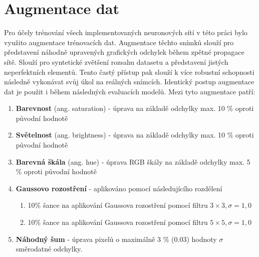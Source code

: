 \section{Augmentace dat}
\label{sec:Chapter41}
Pro účely trénování všech implementovaných neuronových sítí v této práci bylo využito augmentace trénovacích dat. Augmentace těchto snímků slouží pro představení náhodně upravených grafických odchylek během zpětné propagace sítě. Slouží pro syntetické zvětšení rozsahu datasetu a představení jistých neperfektních elementů. Tento častý přístup pak slouží k více robustní schopnosti následně vykonávat svůj úkol na reálných snímcích. Identický postup augmentace dat je použit i během následných evaluacích modelů. Mezi tyto augmentace patří:
\begin{enumerate}
  \item \textbf{Barevnost} (ang. saturation) - úprava na základě odchylky max. 10 \% oproti původní hodnotě
  \item \textbf{Světelnost} (ang. brightness) - úprava na základě odchylky max. 10 \% oproti původní hodnotě
  \item \textbf{Barevná škála} (ang. hue) - úprava RGB škály na základě odchylky max. 5 \% oproti původní hodnotě
  \item \textbf{Gaussovo rozostření} - aplikováno pomocí následujícího rozdělení
  \begin{enumerate}
      \item 10\% šance na aplikování Gaussova rozostření pomocí filtru $3\times3, \sigma=1,0$
      \item 10\% šance na aplikování Gaussova rozostření pomocí filtru $5\times5, \sigma=1,0$
  \end{enumerate}
  \item \textbf{Náhodný šum} - úprava pixelů o maximálně 3 \% (0.03) hodnoty $\sigma$ směrodatné odchylky.
\end{enumerate}
\endinput